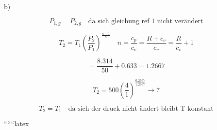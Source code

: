 b) 

\[
P_{1,g} = P_{2,g} \quad \text{da sich gleichung ref 1 nicht verändert}
\]

\[
T_2 = T_1 \left( \frac{P_2}{P_1} \right)^{\frac{n-1}{n}} \quad n = \frac{c_p}{c_v} = \frac{R + c_v}{c_v} = \frac{R}{c_v} + 1
\]

\[
= \frac{8.314}{50} + 0.633 = 1.2667
\]

\[
T_2 = 500 \left( \frac{4}{1} \right)^{\frac{0.2667}{1.2667}} \rightarrow 7
\]

\[
T_2 = T_1 \quad \text{da sich der druck nicht ändert bleibt T konstant}
\]

``````latex